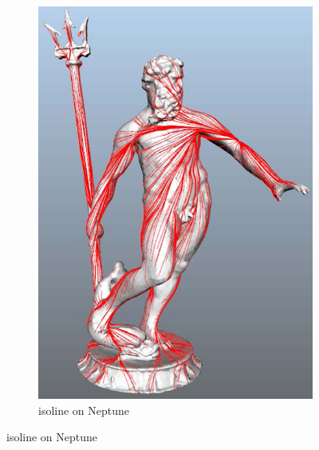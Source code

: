 \begin{figure}
\begin{subfigure}[b]{0.5\textwidth}
                \includegraphics[width=\textwidth]{../images/geodesic_image/neptune_path-1}
                \caption{isoline on Neptune}
                \label{fig:neptune_iso}
        \end{subfigure}%
\end{figure}


